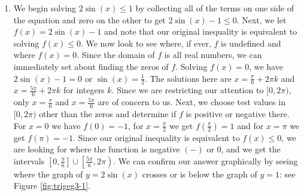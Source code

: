 {
\begin{enumerate}

\item  We begin solving $2\sin(x) \leq 1$ by collecting all of the terms on one side of the equation and zero on the other to get $2\sin(x) - 1 \leq 0$.  Next, we let $f(x) = 2\sin(x) - 1$ and note that our original inequality is equivalent to solving $f(x) \leq 0$. We now look to see where, if ever, $f$ is undefined and where $f(x) = 0$.  Since the domain of $f$ is all real numbers, we can immediately set  about finding the zeros of $f$.  Solving $f(x) = 0$, we have $2\sin(x) - 1=0$ or $\sin(x) = \frac{1}{2}$.  The solutions here are $x = \frac{\pi}{6} + 2\pi k$ and $x = \frac{5\pi}{6} + 2\pi k$ for integers $k$.  Since we are restricting our attention to $[0,2\pi)$, only $x = \frac{\pi}{6}$ and $x = \frac{5\pi}{6}$ are of concern to us.  Next, we choose test values in $[0,2\pi)$ other than the zeros and determine if $f$ is positive or negative there.  For $x = 0$ we have $f(0) = -1$, for $x = \frac{\pi}{2}$ we get $f\left(\frac{\pi}{2}\right) = 1$ and for $x = \pi$ we get $f(\pi) = -1$.  Since our original inequality is equivalent to $f(x) \leq 0$, we are looking for where the function is negative $(-)$ or $0$, and we get the intervals $\left[0, \frac{\pi}{6}\right] \cup \left[\frac{5\pi}{6}, 2\pi \right)$.  We can confirm our answer graphically by seeing where the graph of $y = 2\sin(x)$ crosses or is below the graph of $y = 1$: see Figure \ref{fig:trigeg3-1}. 




\end{enumerate}}
